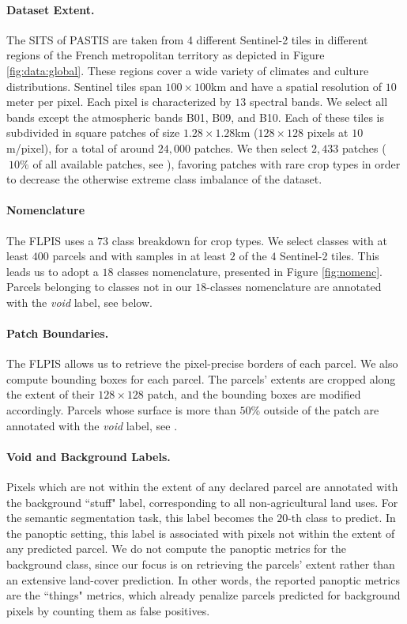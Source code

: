 \paragraph{Dataset Extent.} 
The SITS of PASTIS are taken from 4 different Sentinel-2 tiles in different regions of the French metropolitan territory as depicted in Figure \ref{fig:data:global}. These regions cover a wide variety of climates and culture distributions.
Sentinel tiles span $100\times100$km and have a spatial resolution of $10$ meter per pixel. Each pixel is characterized by $13$ spectral bands. We select all bands except the atmospheric bands B01, B09, and B10.
Each of these tiles is subdivided in square patches of size $1.28\times1.28$km ($128\times128$ pixels at $10$m/pixel), for a total of around $24,000$ patches.
We then select $2,433$ patches ($~10\%$ of all available patches, see ), favoring patches with rare crop types in order to decrease the otherwise extreme class imbalance of the dataset.



\paragraph{Nomenclature} 
The FLPIS uses a $73$ class breakdown for crop types. 
We select classes with at least $400$ parcels and with samples in at least $2$ of the $4$ Sentinel-2 tiles. This leads us to adopt a $18$ classes nomenclature, presented in Figure \ref{fig:nomenc}.
Parcels belonging to classes not in our $18$-classes nomenclature are annotated with the \emph{void} label, see below.

\paragraph{Patch Boundaries.}
The FLPIS allows us to retrieve the pixel-precise borders of each parcel. We also compute bounding boxes for each parcel.
The parcels' extents are cropped along the extent of their $128 \times 128$ patch, and the bounding boxes are modified accordingly.
Parcels whose surface is more than $50$\% outside of the patch are annotated with the \emph{void} label, see .


\paragraph{Void and Background Labels.} Pixels which are not within the extent of any declared parcel are annotated with the background ``stuff" label, corresponding to all non-agricultural land uses. For the semantic segmentation task, this label becomes the $20$-th class to predict. In the panoptic setting, this label is associated with pixels not within the extent of any predicted parcel. 
We do not compute the panoptic metrics for the background class, since our focus is on retrieving the parcels' extent rather than an extensive land-cover prediction. In other words, the reported panoptic metrics are the ``things" metrics, which already penalize parcels predicted for background pixels by counting them as false positives.

